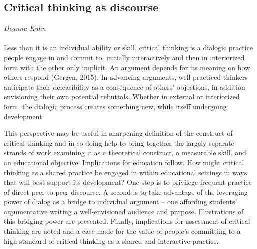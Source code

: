 \subsection*{Critical thinking as discourse}
\emph{Deanna Kuhn}
\\\\
Less than it is an individual ability or skill, critical thinking is a dialogic practice people engage in and commit to, initially interactively and then in interiorized form with the other only implicit. An argument depends for its meaning on how others respond (Gergen, 2015). In advancing arguments, well-practiced thinkers anticipate their defeasibility as a consequence of others’ objections, in addition envisioning their own potential rebuttals. Whether in external or interiorized form, the dialogic process creates something new, while itself undergoing development.

This perspective may be useful in sharpening definition of the construct of critical thinking and in so doing help to bring together the largely separate strands of work examining it as a theoretical construct, a measurable skill, and an educational objective. Implications for education follow. How might critical thinking as a shared practice be engaged in within educational settings in ways that will best support its development? One step is to privilege frequent practice of direct peer-to-peer discourse. A second is to take advantage of the leveraging power of dialog as a bridge to individual argument – one affording students’ argumentative writing a well-envisioned audience and purpose. Illustrations of this bridging power are presented.   Finally, implications for assessment of critical thinking are noted and a case made for the value of people’s committing to a high standard of critical thinking as a shared and interactive practice.


